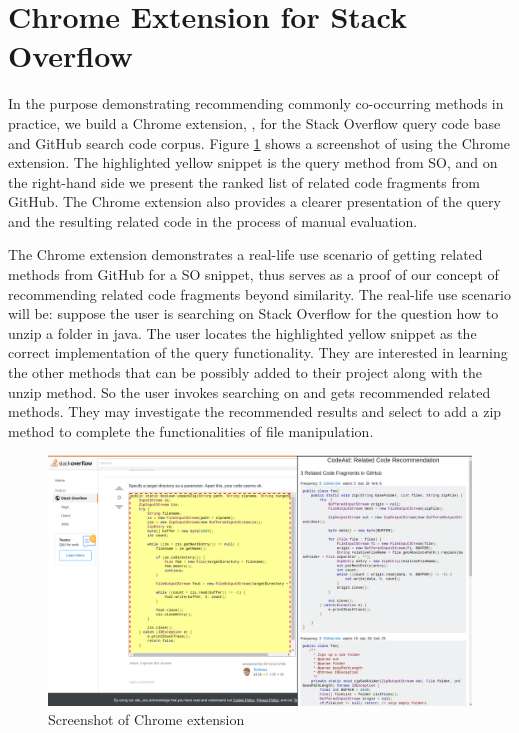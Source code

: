 \section{Chrome Extension for Stack Overflow}
\label{sec:chrome}

In the purpose demonstrating recommending commonly co-occurring methods in practice, we build a Chrome extension, {\tool}, for the Stack Overflow query code base and GitHub search code corpus. Figure \ref{fig:chrome} shows a screenshot of using the Chrome extension. The highlighted yellow snippet is the query method from SO, and on the right-hand side we present the ranked list of related code fragments from GitHub. The Chrome extension also provides a clearer presentation of the query and the resulting related code in the process of manual evaluation.

The Chrome extension demonstrates a real-life use scenario of getting related methods from GitHub for a SO snippet, thus serves as a proof of our concept of recommending related code fragments beyond similarity.
The real-life use scenario will be: suppose the user is searching on Stack Overflow for the question {\ttt how to unzip a folder in java}. The user locates the highlighted yellow snippet as the correct implementation of the query functionality. They are interested in learning the other methods that can be possibly added to their project along with the {\ttt unzip} method. So the user invokes searching on {\tool} and gets recommended related methods. They may investigate the recommended results and select to add a {\ttt zip} method to complete the functionalities of file manipulation. 

\begin{figure}[!h]
	\includegraphics[width=\linewidth]{figures/ui.png}
	\caption{Screenshot of Chrome extension}
	\label{fig:chrome}
\end{figure}

